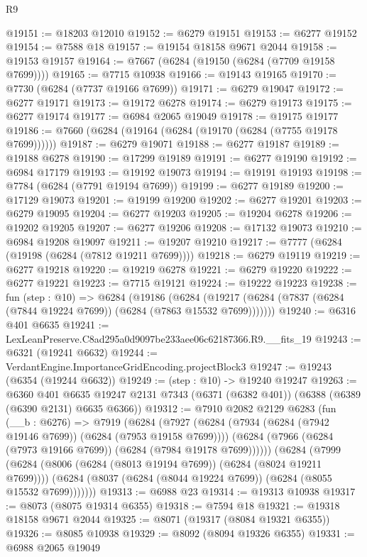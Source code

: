 \begin{lexlean}{R9}
\begin{coremodule}
@19151 := @18203 @12010
@19152 := @6279 @19151
@19153 := @6277 @19152
@19154 := @7588 @18
@19157 := @19154 @18158 @9671 @2044
@19158 := @19153 @19157
@19164 := @7667 (@6284 (@19150 (@6284 (@7709 @19158 @7699))))
@19165 := @7715 @10938
@19166 := @19143 @19165
@19170 := @7730 (@6284 (@7737 @19166 @7699))
@19171 := @6279 @19047
@19172 := @6277 @19171
@19173 := @19172 @6278
@19174 := @6279 @19173
@19175 := @6277 @19174
@19177 := @6984 @2065 @19049
@19178 := @19175 @19177
@19186 := @7660 (@6284 (@19164 (@6284 (@19170 (@6284 (@7755 @19178 @7699))))))
@19187 := @6279 @19071
@19188 := @6277 @19187
@19189 := @19188 @6278
@19190 := @17299 @19189
@19191 := @6277 @19190
@19192 := @6984 @17179
@19193 := @19192 @19073
@19194 := @19191 @19193
@19198 := @7784 (@6284 (@7791 @19194 @7699))
@19199 := @6277 @19189
@19200 := @17129 @19073
@19201 := @19199 @19200
@19202 := @6277 @19201
@19203 := @6279 @19095
@19204 := @6277 @19203
@19205 := @19204 @6278
@19206 := @19202 @19205
@19207 := @6277 @19206
@19208 := @17132 @19073
@19210 := @6984 @19208 @19097
@19211 := @19207 @19210
@19217 := @7777 (@6284 (@19198 (@6284 (@7812 @19211 @7699))))
@19218 := @6279 @19119
@19219 := @6277 @19218
@19220 := @19219 @6278
@19221 := @6279 @19220
@19222 := @6277 @19221
@19223 := @7715 @19121
@19224 := @19222 @19223
@19238 := fun (step : @10) =>
  @6284
    (@19186
      (@6284 (@19217 (@6284 (@7837 (@6284 (@7844 @19224 @7699)) (@6284 (@7863 @15532 @7699)))))))
@19240 := @6316 @401 @6635
@19241 := LexLeanPreserve.C8ad295a0d9097be233aee06c62187366.R9.__fits_19
@19243 := @6321 (@19241 @6632)
@19244 := VerdantEngine.ImportanceGridEncoding.projectBlock3
@19247 := @19243 (@6354 (@19244 @6632))
@19249 := (step : @10) -> @19240 @19247
@19263 := @6360
    @401
    @6635
    @19247
    @2131
    @7343
    (@6371 (@6382 @401))
    (@6388 (@6389 (@6390 @2131) @6635 @6366))
@19312 := @7910
    @2082
    @2129
    @6283
    (fun (__b : @6276) =>
    @7919
      (@6284
        (@7927
          (@6284 (@7934 (@6284 (@7942 @19146 @7699)) (@6284 (@7953 @19158 @7699))))
          (@6284 (@7966 (@6284 (@7973 @19166 @7699)) (@6284 (@7984 @19178 @7699))))))
      (@6284
        (@7999
          (@6284 (@8006 (@6284 (@8013 @19194 @7699)) (@6284 (@8024 @19211 @7699))))
          (@6284 (@8037 (@6284 (@8044 @19224 @7699)) (@6284 (@8055 @15532 @7699)))))))
@19313 := @6988 @23
@19314 := @19313 @10938
@19317 := @8073 (@8075 @19314 @6355)
@19318 := @7594 @18
@19321 := @19318 @18158 @9671 @2044
@19325 := @8071 (@19317 (@8084 @19321 @6355))
@19326 := @8085 @10938
@19329 := @8092 (@8094 @19326 @6355)
@19331 := @6988 @2065 @19049

\end{coremodule}
\end{lexlean}

